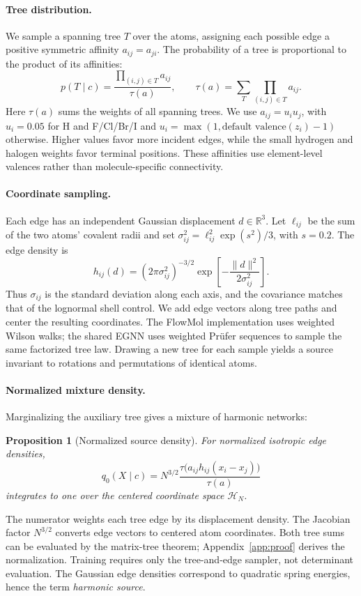 \documentclass{article}
\newtheorem{proposition}{Proposition}
\newcommand{\HH}{\mathcal H}
\newcommand{\RR}{\mathbb R}
\begin{document}
\paragraph{Tree distribution.}
We sample a spanning tree $T$ over the atoms, assigning each possible edge a positive symmetric affinity $a_{ij}=a_{ji}$. The probability of a tree is proportional to the product of its affinities:
\begin{equation}
 p(T\mid c)=\frac{\prod_{(i,j)\in T}a_{ij}}{\tau(a)},\qquad
 \tau(a)=\sum_T\prod_{(i,j)\in T}a_{ij}.
 \label{eq:tree-law}
\end{equation}
Here $\tau(a)$ sums the weights of all spanning trees. We use $a_{ij}=u_i u_j$, with $u_i=0.05$ for H and F/Cl/Br/I and $u_i=\max(1,\text{default valence}(z_i)-1)$ otherwise. Higher values favor more incident edges, while the small hydrogen and halogen weights favor terminal positions. These affinities use element-level valences rather than molecule-specific connectivity.

\paragraph{Coordinate sampling.}
Each edge has an independent Gaussian displacement $d\in\RR^3$. Let $\ell_{ij}$ be the sum of the two atoms' covalent radii and set $\sigma_{ij}^2=\ell_{ij}^2\exp(s^2)/3$, with $s=0.2$. The edge density is
\begin{equation}
 h_{ij}(d)=(2\pi\sigma_{ij}^2)^{-3/2}
 \exp\!\left[-\frac{\|d\|^2}{2\sigma_{ij}^2}\right].
 \label{eq:edge-law}
\end{equation}
Thus $\sigma_{ij}$ is the standard deviation along each axis, and the covariance matches that of the lognormal shell control. We add edge vectors along tree paths and center the resulting coordinates. The FlowMol implementation uses weighted Wilson walks; the shared EGNN uses weighted Pr\"ufer sequences to sample the same factorized tree law. Drawing a new tree for each sample yields a source invariant to rotations and permutations of identical atoms.

\paragraph{Normalized mixture density.}
Marginalizing the auxiliary tree gives a mixture of harmonic networks:
\begin{proposition}[Normalized source density]
For normalized isotropic edge densities,
\begin{equation}
 q_0(X\mid c)=N^{3/2}
 \frac{\tau\big(a_{ij}h_{ij}(x_i-x_j)\big)}{\tau(a)}
 \label{eq:source}
\end{equation}
integrates to one over the centered coordinate space $\HH_N$.
\end{proposition}
The numerator weights each tree edge by its displacement density. The Jacobian factor $N^{3/2}$ converts edge vectors to centered atom coordinates. Both tree sums can be evaluated by the matrix-tree theorem; Appendix~\ref{app:proof} derives the normalization. Training requires only the tree-and-edge sampler, not determinant evaluation. The Gaussian edge densities correspond to quadratic spring energies, hence the term \emph{harmonic source}.
\end{document}
